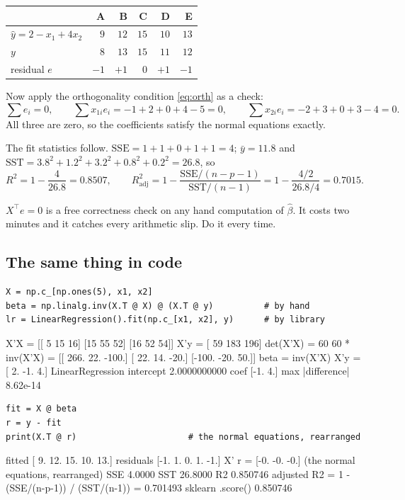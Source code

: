 \documentclass[11pt]{article}
\newcommand{\Xt}{X^{\!\top}}
\begin{document}
\begin{center}
\begin{tabular}{@{}lrrrrr@{}}
\toprule
 & A & B & C & D & E\\
\midrule
$\hat y = 2 - x_1 + 4x_2$ & $9$ & $12$ & $15$ & $10$ & $13$\\
$y$ & $8$ & $13$ & $15$ & $11$ & $12$\\
residual $e$ & $-1$ & $+1$ & $0$ & $+1$ & $-1$\\
\bottomrule
\end{tabular}
\end{center}

Now apply the orthogonality condition \eqref{eq:orth} as a check:
\[
  \textstyle\sum e_i = 0, \qquad
  \sum x_{1i}e_i = -1+2+0+4-5 = 0, \qquad
  \sum x_{2i}e_i = -2+3+0+3-4 = 0 .
\]
All three are zero, so the coefficients satisfy the normal equations exactly.

The fit statistics follow. $\mathrm{SSE} = 1+1+0+1+1 = 4$; $\bar y = 11.8$ and
$\mathrm{SST} = 3.8^2 + 1.2^2 + 3.2^2 + 0.8^2 + 0.2^2 = 26.8$, so
\[
  R^2 = 1 - \frac{4}{26.8} = 0.8507,
  \qquad
  R^2_{\text{adj}} = 1 - \frac{\mathrm{SSE}/(n-p-1)}{\mathrm{SST}/(n-1)}
                   = 1 - \frac{4/2}{26.8/4} = 0.7015 .
\]

\begin{keyidea}
$\Xt e = 0$ is a free correctness check on any hand computation of
$\hat\beta$. It costs two minutes and it catches every arithmetic slip. Do it
every time.
\end{keyidea}

\subsection{The same thing in code}

\begin{lstlisting}
X = np.c_[np.ones(5), x1, x2]
beta = np.linalg.inv(X.T @ X) @ (X.T @ y)          # by hand
lr = LinearRegression().fit(np.c_[x1, x2], y)      # by library
\end{lstlisting}
\begin{codeout}
X'X =
 [[ 5 15 16]
 [15 55 52]
 [16 52 54]]
X'y = [ 59 183 196]
det(X'X) = 60
60 * inv(X'X) =
 [[ 266.   22. -100.]
 [  22.   14.  -20.]
 [-100.  -20.   50.]]
beta = inv(X'X) X'y = [ 2. -1.  4.]
LinearRegression intercept 2.0000000000  coef [-1.  4.]
max |difference| 8.62e-14
\end{codeout}

\begin{lstlisting}
fit = X @ beta
r = y - fit
print(X.T @ r)                      # the normal equations, rearranged
\end{lstlisting}
\begin{codeout}
fitted    [ 9. 12. 15. 10. 13.]
residuals [-1.  1.  0.  1. -1.]
X' r = [-0. -0. -0.]  (the normal equations, rearranged)
SSE 4.0000   SST 26.8000   R2 0.850746
adjusted R2 = 1 - (SSE/(n-p-1)) / (SST/(n-1)) = 0.701493
sklearn .score() 0.850746
\end{codeout}
\end{document}
